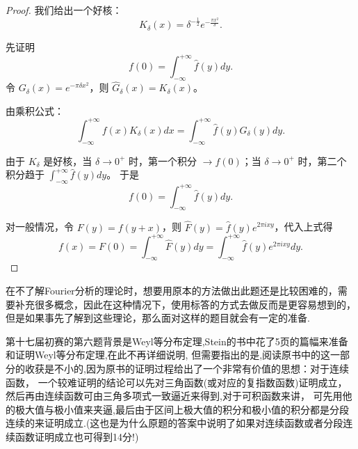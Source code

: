 \documentclass[12pt]{ctexart}  %
\begin{document}
\begin{proof}
我们给出一个好核：
\[
K_\delta(x) = \delta^{-\frac{1}{2}} e^{-\frac{\pi x^2}{\delta}}.
\]

先证明
\[
f(0) = \int_{-\infty}^{+\infty} \hat{f}(y)  dy.
\]
令 \(G_\delta(x) = e^{-\pi \delta x^2}\)，则 \(\hat{G}_\delta(x) = K_\delta(x)\)。

由乘积公式：
\[
\int_{-\infty}^{+\infty} f(x) K_\delta(x) dx = \int_{-\infty}^{+\infty} \hat{f}(y) G_\delta(y) dy.
\]

由于 \(K_\delta\) 是好核，当 \(\delta \to 0^+\) 时，第一个积分 \(\to f(0)\)；当 \(\delta \to 0^+\) 时，第二个积分趋于 \(\int_{-\infty}^{+\infty} \hat{f}(y) dy\)。
于是
\[
f(0) = \int_{-\infty}^{+\infty} \hat{f}(y) dy.
\]

对一般情况，令 \(F(y) = f(y+x)\)，则 \(\hat{F}(y) = \hat{f}(y) e^{2\pi i x y}\)，代入上式得
\[
f(x) = F(0) = \int_{-\infty}^{+\infty} \hat{F}(y) dy = \int_{-\infty}^{+\infty} \hat{f}(y) e^{2\pi i x y} dy.
\]

\end{proof}


\par 在不了解Fourier分析的理论时，想要用原本的方法做出此题还是比较困难的，需要补充很多概念，因此在这种情况下，使用标答的方式去做反而是更容易想到的，
但是如果事先了解到这些理论，那么面对这样的题目就会有一定的准备.

\par 第十七届初赛的第六题背景是Weyl等分布定理,Stein的书中花了5页的篇幅来准备和证明Weyl等分布定理,在此不再详细说明,
但需要指出的是,阅读原书中的这一部分的收获是不小的,因为原书的证明过程给出了一个非常有价值的思想：对于连续函数，
一个较难证明的结论可以先对三角函数(或对应的复指数函数)证明成立，然后再由连续函数可由三角多项式一致逼近来得到,对于可积函数来讲，
可先用他的极大值与极小值来夹逼,最后由于区间上极大值的积分和极小值的积分都是分段连续的来证明成立.(这也是为什么原题的答案中说明了如果对连续函数或者分段连续函数证明成立也可得到14分!)
\end{document}
